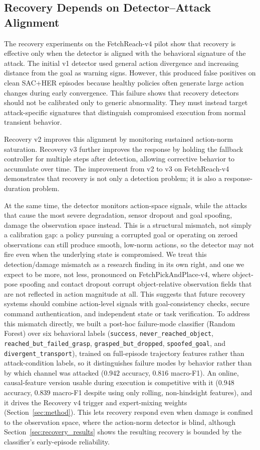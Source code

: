 \documentclass[conference]{IEEEtran}
\begin{document}
\subsection{Recovery Depends on Detector--Attack Alignment}

The recovery experiments on the FetchReach-v4 pilot show that recovery is effective
only when the detector is aligned with the behavioral signature of the attack. The
initial v1 detector used general action divergence and increasing distance from the
goal as warning signs. However, this produced false positives on clean SAC+HER episodes
because healthy policies often generate large action changes during early convergence.
This failure shows that recovery detectors should not be calibrated only to generic
abnormality. They must instead target attack-specific signatures that distinguish
compromised execution from normal transient behavior.

Recovery v2 improves this alignment by monitoring sustained action-norm saturation.
Recovery v3 further improves the response by holding the fallback controller for
multiple steps after detection, allowing corrective behavior to accumulate over time.
The improvement from v2 to v3 on FetchReach-v4 demonstrates that recovery is not only a
detection problem; it is also a response-duration problem.

At the same time, the detector monitors action-space signals, while the attacks that
cause the most severe degradation, sensor dropout and goal spoofing, damage the
observation space instead. This is a structural mismatch, not simply a calibration gap:
a policy pursuing a corrupted goal or operating on zeroed observations can still
produce smooth, low-norm actions, so the detector may not fire even when the underlying
state is compromised. We treat this detection/damage mismatch as a research finding in
its own right, and one we expect to be more, not less, pronounced on
FetchPickAndPlace-v4, where object-pose spoofing and contact dropout corrupt
object-relative observation fields that are not reflected in action magnitude at all.
This suggests that future recovery systems should combine action-level signals with
goal-consistency checks, secure command authentication, and independent state or task
verification. To address this mismatch directly, we built a post-hoc failure-mode
classifier (Random Forest) over six behavioral labels (\texttt{success},
\texttt{never\_reached\_object}, \texttt{reached\_but\_failed\_grasp},
\texttt{grasped\_but\_dropped}, \texttt{spoofed\_goal}, and
\texttt{divergent\_transport}), trained on full-episode trajectory features rather than
attack-condition labels, so it distinguishes failure modes by behavior rather than by
which channel was attacked ($0.942$ accuracy, $0.816$ macro-F1). An online,
causal-feature version usable during execution is competitive with it ($0.948$ accuracy,
$0.839$ macro-F1 despite using only rolling, non-hindsight features), and it drives the
Recovery v4 trigger and expert-mixing weights (Section~\ref{sec:method}). This lets
recovery respond even when damage is confined to the observation space, where the
action-norm detector is blind, although Section~\ref{sec:recovery_results} shows the
resulting recovery is bounded by the classifier's early-episode reliability.
\end{document}
